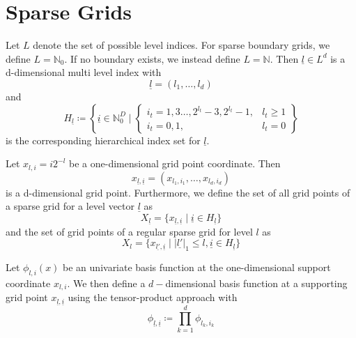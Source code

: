 \documentclass[
  a4paper,  %
  twoside,  %
  bibliography=totoc,
  headsepline,
  cleardoublepage=empty,
  parskip=half,
  draft=false
]{scrbook}
\begin{document}
\section{Sparse Grids}

\begin{definition}
Let $L$ denote the set of possible level indices.
For sparse boundary grids, we define $L=\mathds{N}_0$. If no boundary exists, we instead define $L=\mathds{N}$.
Then $\underline{l} \in L^d$ is a d-dimensional multi level index with
\begin{equation}
\underline{l} =(l_1, \dots, l_d)
\end{equation}
and
\begin{equation}
H_{\underline{l}} \coloneqq \left\{ \underline{i} \in \mathbb{N}^D_0 \mid
\begin{cases}
    i_t=1,3\dots,2^{l_t} - 3, 2^{l_t} - 1, & l_t \geq 1 \\
    i_t=0,1, & l_t = 0
\end{cases} \right\}
\end{equation}
is the corresponding hierarchical index set for $\underline{l}$.
\end{definition}

\begin{definition}
Let $x_{l,i}=i2^{-l}$ be a one-dimensional grid point coordinate.
Then
\begin{equation}
x_{\underline{l},\underline{i}}=(x_{l_1,i_1}, \dots, x_{l_d,i_d})
\end{equation}
is a d-dimensional grid point.
Furthermore, we define the set of all grid points of a sparse grid for a level vector $\underline{l}$ as
\begin{equation}
X_{\underline{l}}=\{x_{\underline{l},\underline{i}} \mid \underline{i} \in H_{\underline{l}}\}
\end{equation}
and the set of grid points of a regular sparse grid for level $l$ as
\begin{equation}
X_{l}=\{x_{\underline{l'},\underline{i}} \mid |\underline{l'}|_1 \leq l, \underline{i} \in H_{\underline{l}}\}
\end{equation}
\end{definition}

\begin{definition}
Let $\phi_{l,i}(x)$ be an univariate basis function at the one-dimensional support coordinate $x_{l,i}$.
We then define a $d-$dimensional basis function at a supporting grid point $x_{\underline{l},\underline{i}}$ using the tensor-product approach with
\begin{equation}
\phi_{\underline{l},\underline{i}} \coloneqq \prod_{k=1}^{d} \phi_{l_k,i_k}
\end{equation}
\end{definition}
\end{document}
